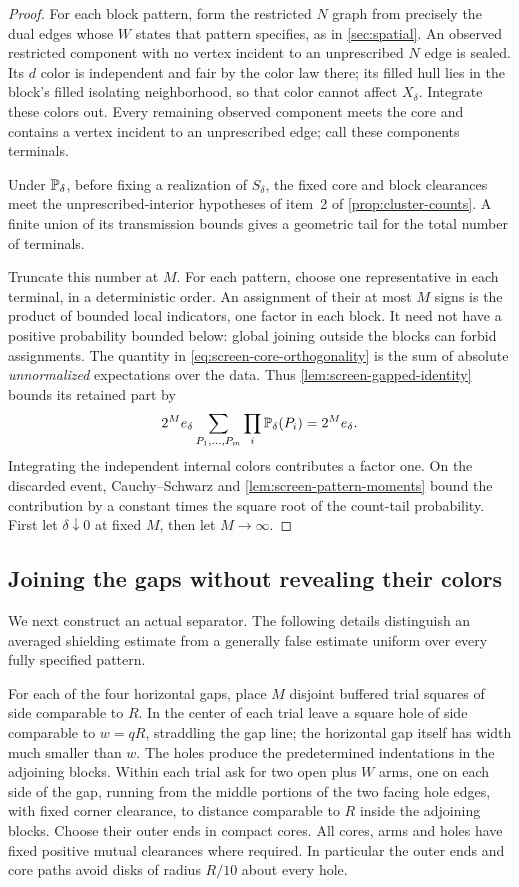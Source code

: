\begin{proof}
For each block pattern, form the restricted $N$ graph from precisely the
dual edges whose $W$ states that pattern specifies, as in \cref{sec:spatial}.
An observed restricted component with no vertex incident to an unprescribed
$N$ edge is sealed. Its $d$ color is independent and fair by the color law
there; its filled hull lies in the block's filled isolating neighborhood,
so that color cannot affect $X_\delta$. Integrate these colors out. Every
remaining observed component meets the core and contains a vertex incident
to an unprescribed edge; call these components terminals.

Under $\P_\delta$, before fixing a realization of $S_\delta$, the fixed
core and block clearances meet the unprescribed-interior hypotheses of
item~2 of \cref{prop:cluster-counts}. A finite union of its transmission
bounds gives a geometric tail for the total number of terminals.

Truncate this number at $M$. For each pattern, choose one representative
in each terminal, in a deterministic order. An assignment
of their at most $M$ signs is the product of bounded local indicators,
one factor in each block. It need not have a positive probability bounded
below: global joining outside the blocks can forbid assignments. The
quantity in \eqref{eq:screen-core-orthogonality} is the sum of absolute
\emph{unnormalized} expectations over the data. Thus
\cref{lem:screen-gapped-identity} bounds its retained part by
\[
 2^M e_\delta
       \sum_{P_1,\ldots,P_m}\prod_i\P_\delta(P_i)
       =2^M e_\delta.
\]
Integrating the independent internal colors contributes a factor one.
On the discarded event, Cauchy--Schwarz and
\cref{lem:screen-pattern-moments} bound the contribution by a constant
times the square root of the count-tail probability. First let
$\delta\downarrow0$ at fixed $M$, then let $M\to\infty$.
\end{proof}

\subsection{Joining the gaps without revealing their colors}

We next construct an actual separator. The following details distinguish
an averaged shielding estimate from a generally false estimate uniform
over every fully specified pattern.

For each of the four horizontal gaps, place $M$ disjoint buffered trial
squares of side comparable to $R$. In the center of each trial leave a
square hole of side comparable to $w=qR$, straddling the gap line; the
horizontal gap itself has width much smaller than $w$. The holes produce
the predetermined indentations in the adjoining blocks. Within each
trial ask for two open plus $W$ arms, one on each side of the gap, running
from the middle portions of the two facing hole edges, with fixed corner
clearance, to distance comparable to $R$ inside the adjoining blocks.
Choose their outer ends in compact cores. All cores,
arms and holes have fixed positive mutual clearances where required.
In particular the outer ends and core paths avoid disks of radius $R/10$
about every hole.

